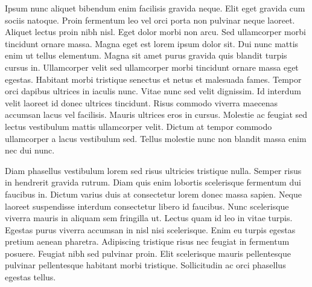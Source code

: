 Ipsum nunc aliquet bibendum enim facilisis gravida neque. Elit eget gravida cum sociis natoque. Proin fermentum leo vel orci porta non pulvinar neque laoreet. Aliquet lectus proin nibh nisl. Eget dolor morbi non arcu. Sed ullamcorper morbi tincidunt ornare massa. Magna eget est lorem ipsum dolor sit. Dui nunc mattis enim ut tellus elementum. Magna sit amet purus gravida quis blandit turpis cursus in. Ullamcorper velit sed ullamcorper morbi tincidunt ornare massa eget egestas. Habitant morbi tristique senectus et netus et malesuada fames. Tempor orci dapibus ultrices in iaculis nunc. Vitae nunc sed velit dignissim. Id interdum velit laoreet id donec ultrices tincidunt. Risus commodo viverra maecenas accumsan lacus vel facilisis. Mauris ultrices eros in cursus. Molestie ac feugiat sed lectus vestibulum mattis ullamcorper velit. Dictum at tempor commodo ullamcorper a lacus vestibulum sed. Tellus molestie nunc non blandit massa enim nec dui nunc.

Diam phasellus vestibulum lorem sed risus ultricies tristique nulla. Semper risus in hendrerit gravida rutrum. Diam quis enim lobortis scelerisque fermentum dui faucibus in. Dictum varius duis at consectetur lorem donec massa sapien. Neque laoreet suspendisse interdum consectetur libero id faucibus. Nunc scelerisque viverra mauris in aliquam sem fringilla ut. Lectus quam id leo in vitae turpis. Egestas purus viverra accumsan in nisl nisi scelerisque. Enim eu turpis egestas pretium aenean pharetra. Adipiscing tristique risus nec feugiat in fermentum posuere. Feugiat nibh sed pulvinar proin. Elit scelerisque mauris pellentesque pulvinar pellentesque habitant morbi tristique. Sollicitudin ac orci phasellus egestas tellus.
